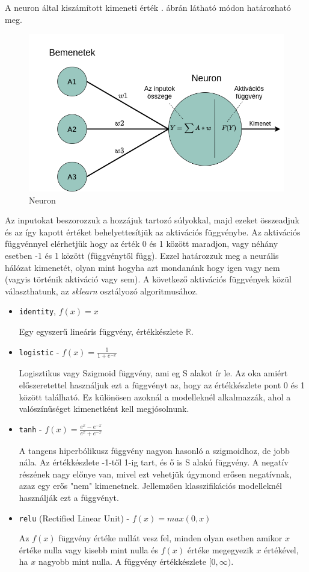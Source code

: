 \noindent A neuron által kiszámított kimeneti érték . ábrán látható módon határozható meg.
\begin{figure}[h!]
\centering
\includegraphics[scale=0.5]{images/neuron.png}
\caption{Neuron}
\label{fig:neuron}
\end{figure}

Az inputokat beszorozzuk a hozzájuk tartozó súlyokkal, majd ezeket összeadjuk és az így kapott értéket behelyettesítjük az aktivációs függvénybe.
Az aktivációs függvénnyel elérhetjük hogy az érték 0 és 1 között maradjon, vagy néhány esetben -1 és 1 között (függvénytől függ). Ezzel határozzuk meg a neurális hálózat kimenetét, olyan mint hogyha azt mondanánk hogy igen vagy nem (vagyis történik aktiváció vagy sem). 
A következő aktivációs függvények közül választhatunk, az \textit{sklearn} osztályozó algoritmusához.
\begin{itemize}
\item \texttt{identity}, $f(x) = x$

Egy egyszerű lineáris függvény, értékkészlete $\mathbb{R}$.
\item \texttt{logistic} - $f(x) = \frac{1}{1+e^{-x}}$

Logisztikus vagy Szigmoid függvény, ami eg S alakot ír le. Az oka amiért előszeretettel használjuk ezt a függvényt az, hogy az értékkészlete pont 0 és 1 között található. Ez különösen azoknál a modelleknél alkalmazzák, ahol a valószínűséget kimenetként kell megjósolnunk.
\item \texttt{tanh} - $f(x) = \frac{e^{x}-e^{-x}}{e^{x}+e^{-x}}$

A tangens hiperbólikusz függvény nagyon hasonló a szigmoidhoz, de jobb nála. Az értékkészlete -1-től 1-ig tart, és ő is S alakú függvény.
A negatív részének nagy előnye van, mivel ezt vehetjük úgymond erősen negatívnak, azaz egy erős "nem" kimenetnek. Jellemzően klasszifikációs modelleknél használják ezt a függvényt.
\item \texttt{relu} (Rectified Linear Unit) - $f(x) = max(0,x)$

Az $f(x)$ függvény értéke nullát vesz fel, minden olyan esetben amikor $x$ értéke nulla vagy kisebb mint nulla és $f(x)$ értéke megegyezik $x$ értékével, ha $x$ nagyobb mint nulla.
A függvény értékkészlete $[0,\infty)$.
\end{itemize}

